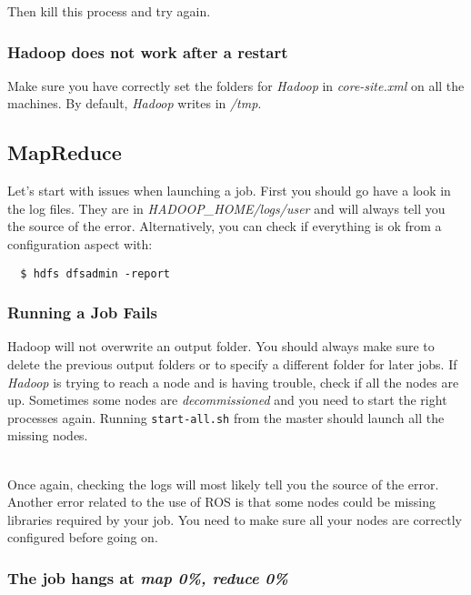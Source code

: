 \documentclass[a4paper, 12pt]{article}
\begin{document}
Then kill this process and try again.

    \subsubsection*{Hadoop does not work after a restart}
    
Make sure you have correctly set the folders for \textit{Hadoop} in \textit{core-site.xml} on all the machines. By default, \textit{Hadoop} writes in \textit{/tmp}.

  \subsection{MapReduce}

Let's start with issues when launching a job. First you should go have a look in the log files. They are in \textit{HADOOP\_HOME/logs/user} and will always tell you the source of the error. Alternatively, you can check if everything is ok from a configuration aspect with:

\begin{verbatim}
  $ hdfs dfsadmin -report
\end{verbatim}
  
    \subsubsection*{Running a Job Fails}

Hadoop will not overwrite an output folder. You should always make sure to delete the previous output folders or to specify a different folder for later jobs. If \textit{Hadoop} is trying to reach a node and is having trouble, check if all the nodes are up. Sometimes some nodes are \textit{decommissioned} and you need to start the right processes again. Running \texttt{start-all.sh} from the master should launch all the missing nodes.

~\\
Once again, checking the logs will most likely tell you the source of the error. Another error related to the use of ROS is that some nodes could be missing libraries required by your job. You need to make sure all your nodes are correctly configured before going on.
   
    \subsubsection*{The job hangs at \textit{map 0\%, reduce 0\%}}
\end{document}
